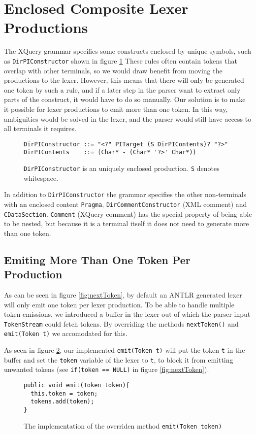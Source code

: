 \section{Enclosed Composite Lexer Productions}
\label{sect:rewriteGrammar:enclosedComposite}
 The XQuery grammar specifies some constructs enclosed by unique symbols, such as \verb!DirPIConstructor! shown in figure \ref{fig:pragma} These rules often contain tokens that overlap with other terminals, so we would draw benefit from moving the productions to the lexer. However, this means that there will only be generated one token by such a rule, and if a later step in the parser want to extract only parts of the construct, it would have to do so manually. Our solution is to make it possible for lexer productions to emit more than one token. In this way, ambiguities would be solved in the lexer, and the parser would still have access to all terminals it requires.

\begin{figure}[h!]
\begin{Verbatim}
DirPIConstructor ::= "<?" PITarget (S DirPIContents)? "?>"
DirPIContents    ::= (Char* - (Char* '?>' Char*))
\end{Verbatim}
\label{fig:pragma}
\caption[An enclosed production]{\texttt{DirPIConstructor} is an uniquely enclosed production. \texttt{S} denotes whitespace.}
\end{figure}

In addition to \verb!DirPIConstructor! the grammar specifies the other non-terminals with an enclosed content \verb!Pragma!,  \verb!DirCommentConstructor! (XML comment) and \verb!CDataSection!. \verb!Comment! (XQuery comment) has the special property of being able to be nested, but because it is a terminal itself it does not need to generate more than one token.

\subsection{Emiting More Than One Token Per Production}
\label{sect:implementation:emittingMoreTokens}
As can be seen in figure \ref{fig:nextToken}, by default an ANTLR generated
lexer will only emit one token per lexer production. To be able to handle
multiple token emissions, we introduced a buffer in the lexer out of which the
parser input \verb!TokenStream! could fetch tokens. By overriding the methods
\verb!nextToken()! and \verb!emit(Token t)! we accomodated for this.  


As seen in figure \ref{fig:emitToken}, our implemented \verb!emit(Token t)!
will put the token \verb!t! in the buffer and set the \verb!token! variable of the lexer to \verb!t!, to block it from emitting unwanted tokens (see \verb!if(token == NULL)! in figure \ref{fig:nextToken}).
\begin{figure}[h!]
\begin{Verbatim}
public void emit(Token token){
  this.token = token;
  tokens.add(token);
}
\end{Verbatim}
\caption[The overridden \texttt{emit(Token t)}]{The implementation of the overriden method \texttt{emit(Token token)}}
\label{fig:emitToken}
\end{figure}

